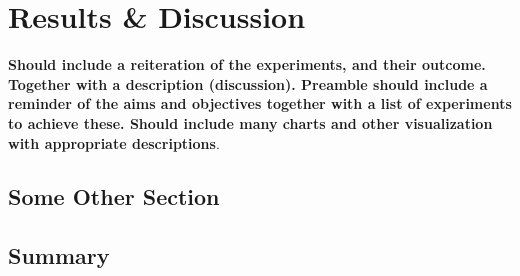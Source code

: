 \chapter{Results \& Discussion}
\textbf{Should include a reiteration of the experiments, and their outcome.  Together with a description (discussion).  Preamble should include a reminder of the aims and objectives together with a list of experiments to achieve these.  Should include many charts and other visualization with appropriate descriptions}.  

\Blindtext

\section{Some Other Section}
\Blindtext

\section{Summary}
\blindtext